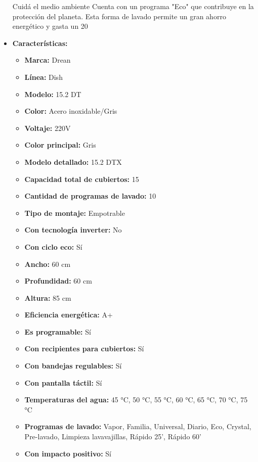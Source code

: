 \documentclass{article}
\begin{document}
\begin{adjustwidth}{2em}{}
\begin{itemize}
Cuidá el medio ambiente
Cuenta con un programa "Eco" que contribuye en la protección del planeta. Esta forma de lavado permite un gran ahorro energético y gasta un 20%
    \item \textbf{Características:} 
    \begin{itemize}
        \item \textbf {Marca:} Drean
    \item \textbf {Línea:} Dish
    \item \textbf {Modelo:} 15.2 DT
    \item \textbf {Color:} Acero inoxidable/Gris
    \item \textbf {Voltaje:} 220V
    \item \textbf {Color principal:} Gris
    \item \textbf {Modelo detallado:} 15.2 DTX
    \item \textbf {Capacidad total de cubiertos:} 15
    \item \textbf {Cantidad de programas de lavado:} 10
    \item \textbf {Tipo de montaje:} Empotrable
    \item \textbf {Con tecnología inverter:} No
    \item \textbf {Con ciclo eco:} Sí
    \item \textbf {Ancho:} 60 cm
    \item \textbf {Profundidad:} 60 cm
    \item \textbf {Altura:} 85 cm
    \item \textbf {Eficiencia energética:} A+
    \item \textbf {Es programable:} Sí
    \item \textbf {Con recipientes para cubiertos:} Sí
    \item \textbf {Con bandejas regulables:} Sí
    \item \textbf {Con pantalla táctil:} Sí
    \item \textbf {Temperaturas del agua:} 45 °C, 50 °C, 55 °C, 60 °C, 65 °C, 70 °C, 75 °C
    \item \textbf {Programas de lavado:} Vapor, Familia, Universal, Diario, Eco, Crystal, Pre-lavado, Limpieza lavavajillas, Rápido 25', Rápido 60'
    \item \textbf {Con impacto positivo:} Sí
    \end{itemize}
\end{itemize}

\vspace{1\baselineskip} %
\end{adjustwidth}
\end{document}
